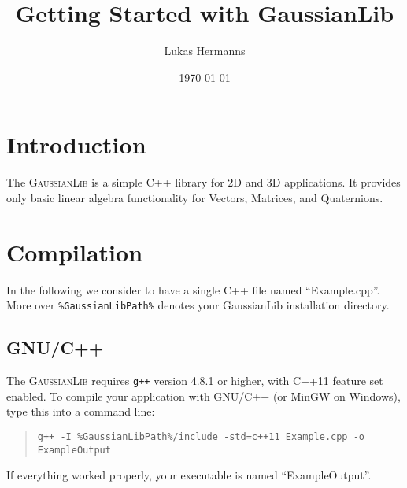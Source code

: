 \documentclass{article}
\title{Getting Started with GaussianLib}
\author{Lukas Hermanns}
\date{\today}
\begin{document}

\def\gausslib{\textsc{GaussianLib}\xspace}


\maketitle



\section*{Introduction}

The \gausslib is a simple C++ library for 2D and 3D applications.
It provides only basic linear algebra functionality for Vectors, Matrices, and Quaternions.



\section*{Compilation}

In the following we consider to have a single C++ file named ``Example.cpp''.
More over \texttt{\%GaussianLibPath\%} denotes your GaussianLib installation directory.

\subsection*{GNU/C++}

The \gausslib requires \texttt{g++} version 4.8.1 or higher, with C++11 feature set enabled.
To compile your application with GNU/C++ (or MinGW on Windows), type this into a command line:
\begin{quote}
\texttt{g++ -I \%GaussianLibPath\%/include -std=c++11 Example.cpp -o ExampleOutput}
\end{quote}
If everything worked properly, your executable is named ``ExampleOutput''.
\end{document}
